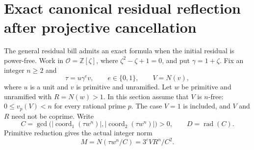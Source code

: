 \section{Exact canonical residual reflection after projective cancellation}
\label{crr-section}

The general residual bill admits an exact formula when the initial
residual is power-free. Work in $\mathcal O=\mathbb Z[\zeta]$, where
$\zeta^2-\zeta+1=0$, and put $\gamma=1+\zeta$.
Fix an integer $n\ge2$ and
\[
 \tau=u\gamma^e v,\qquad e\in\{0,1\},\qquad V=N(v),
\]
where $u$ is a unit and $v$ is primitive and unramified. Let $w$ be
primitive and unramified with $R=N(w)>1$. In this section assume
that $V$ is $n$-free: $0\le v_p(V)<n$ for every rational prime $p$.
The case $V=1$ is included, and $V$ and $R$ need not be coprime.
Write
\[
 C=\gcd\bigl(|\operatorname{coord}_1(\tau w^n)|,
              |\operatorname{coord}_2(\tau w^n)|\bigr)>0,
 \qquad D=\operatorname{rad}(C).
\]
Primitive reduction gives the actual integer norm
\begin{equation}\label{crr-norm}
 M=N(\tau w^n/C)=3^eVR^n/C^2.
\end{equation}

